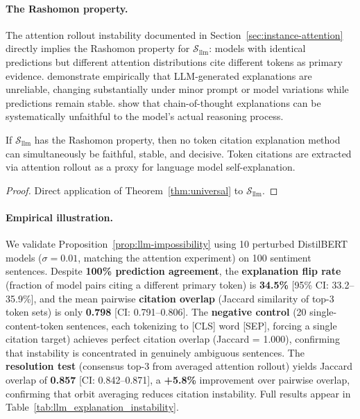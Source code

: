 \paragraph{The Rashomon property.}
The attention rollout instability documented in
Section~\ref{sec:instance-attention} directly implies the Rashomon property
for $\mathcal{S}_{\mathrm{llm}}$: models with identical predictions but
different attention distributions cite different tokens as primary evidence.
\citet{ye2022unreliability} demonstrate empirically that LLM-generated
explanations are unreliable, changing substantially under minor prompt or
model variations while predictions remain stable.  \citet{turpin2024language}
show that chain-of-thought explanations can be systematically unfaithful
to the model's actual reasoning process.

\begin{proposition}
\label{prop:llm-impossibility}
If $\mathcal{S}_{\mathrm{llm}}$ has the Rashomon property, then no
token citation explanation method can simultaneously be faithful, stable,
and decisive. Token citations are extracted via attention rollout as a proxy
for language model self-explanation.
\end{proposition}

\begin{proof}
Direct application of Theorem~\ref{thm:universal} to
$\mathcal{S}_{\mathrm{llm}}$.
\end{proof}

\paragraph{Empirical illustration.}
We validate Proposition~\ref{prop:llm-impossibility} using 10 perturbed
DistilBERT models ($\sigma = 0.01$, matching the attention experiment)
on 100 sentiment sentences.  Despite \textbf{100\% prediction agreement},
the \textbf{explanation flip rate} (fraction of model pairs citing a
different primary token) is \textbf{34.5\%} [95\% CI: 33.2--35.9\%],
and the mean pairwise \textbf{citation overlap} (Jaccard similarity of
top-3 token sets) is only \textbf{0.798} [CI: 0.791--0.806].
The \textbf{negative control} (20 single-content-token sentences, each
tokenizing to [CLS] word [SEP], forcing a single citation target) achieves
perfect citation overlap
(Jaccard = 1.000), confirming that instability is concentrated in
genuinely ambiguous sentences.
The \textbf{resolution test} (consensus top-3 from averaged attention
rollout) yields Jaccard overlap of \textbf{0.857} [CI: 0.842--0.871],
a \textbf{+5.8\%} improvement over pairwise overlap, confirming that
orbit averaging reduces citation instability.
Full results appear in Table~\ref{tab:llm_explanation_instability}.

